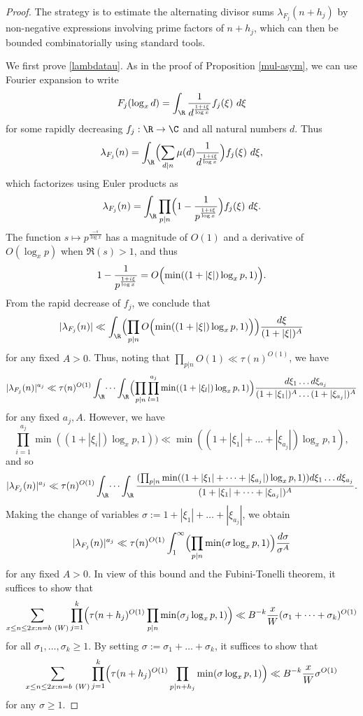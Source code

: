 \begin{proof}  The strategy is to estimate the alternating divisor sums $\lambda_{F_j}(n+h_j)$ by non-negative expressions involving prime factors of $n+h_j$, which can then be bounded combinatorially using standard tools.

We first prove \eqref{lambdatau}.
As in the proof of Proposition \ref{mul-asym}, we can use Fourier expansion to write
$$ F_j( \log_x d ) = \int_\R \frac{1}{d^{\frac{1+i\xi}{\log x}}} f_j(\xi)\ d\xi$$
for some rapidly decreasing $f_j: \R \to \C$ and all natural numbers $d$.  Thus
$$ \lambda_{F_j}(n) = \int_\R \Bigl(\sum_{d|n} \mu(d) \frac{1}{d^{\frac{1+i\xi}{\log x}}}\Bigr) f_j(\xi)\ d\xi, $$
which factorizes using Euler products as
$$ \lambda_{F_j}(n) = \int_\R \prod_{p|n} \Bigl(1 - \frac{1}{p^{\frac{1+i\xi}{\log x}}}\Bigr) f_j(\xi)\ d\xi.$$
The function $s \mapsto p^{\frac{-s}{\log x}}$ has a magnitude of $O(1)$ and a derivative of $O( \log_x p )$ when $\Re(s) > 1$, and thus
$$ 1 - \frac{1}{p^{\frac{1+i\xi}{\log x}}} = O\Bigl( \min( (1+|\xi|) \log_x p, 1) \Bigr).$$
From the rapid decrease of $f_j$, we conclude that
$$ |\lambda_{F_j}(n)| \ll \int_\R \Bigl(\prod_{p|n} O\Bigl( \min( (1+|\xi|) \log_x p, 1)\Bigr)\Bigr) \frac{d\xi}{(1+|\xi|)^A}$$
for any fixed $A > 0$. Thus, noting that $\prod_{p|n}O(1)\ll \tau(n)^{O(1)}$, we have
$$ |\lambda_{F_j}(n)|^{a_j} \ll \tau(n)^{O(1)}\int_\R \dots \int_\R \Bigl(\prod_{p|n}  \prod_{l=1}^{a_j} \min( (1+|\xi_l|) \log_x p, 1)\Bigr) \frac{d\xi_1 \dots d\xi_{a_j}}{(1+|\xi_1|)^A \dots (1+|\xi_{a_j}|)^A}
$$
for any fixed $a_j,A$. However, we have
$$ \prod_{i=1}^{a_j}\min( (1+|\xi_i|) \log_x p, 1)) \ll \min( (1+|\xi_1|+\dots+|\xi_{a_j}|) \log_x p, 1 ), $$
and so
$$ |\lambda_{F_j}(n)|^{a_j} \ll \tau(n)^{O(1)}\int_\R \dots \int_\R \frac{(\prod_{p|n} \min( (1+|\xi_1|+\dots+|\xi_{a_j}|) \log_x p, 1)) d\xi_1 \dots d \xi_{a_j}}{(1+|\xi_1|+\dots+|\xi_{a_j}|)^A}.$$
Making the change of variables $\sigma := 1+|\xi_1|+\dots+|\xi_{a_j}|$, we obtain
$$ |\lambda_{F_j}(n)|^{a_j} \ll \tau(n)^{O(1)} \int_1^\infty \Bigl(\prod_{p|n} \min(\sigma \log_x p, 1)\Bigr) \frac{d\sigma}{\sigma^A}$$
for any fixed $A>0$.  In view of this bound and the Fubini-Tonelli theorem, it suffices to show that
$$
\sum_{x \leq n \leq 2x: n = b\ (W)} \prod_{j=1}^k \Bigl(\tau(n+h_j)^{O(1)} \prod_{p|n} \min(\sigma_j \log_x p,1)\Bigr) \ll B^{-k} \frac{x}{W} (\sigma_1+\dots+\sigma_k)^{O(1)}$$
for all $\sigma_1,\dots,\sigma_k \geq 1$. By setting $\sigma := \sigma_1+\dots+\sigma_k$, it suffices to show that
\begin{equation}\label{xnx}
\sum_{x \leq n \leq 2x: n = b\ (W)} \prod_{j=1}^k \Bigl(\tau(n+h_j)^{O(1)} \prod_{p|n+h_j} \min(\sigma \log_x p,1)\Bigr) \ll B^{-k} \frac{x}{W} \sigma^{O(1)}
\end{equation}
for any $\sigma \geq 1$.


\end{proof}
